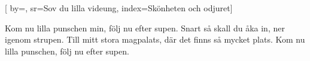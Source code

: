 

[ 		%
	by={},					%
	sr={Sov du lilla videung},					%
	index={Skönheten och odjuret}]						%
	

\beginverse*						%
Kom nu lilla punschen min,
följ nu efter supen. 
Snart så skall du åka in,
ner igenom strupen.
Till mitt stora magpalats,
där det finns så mycket plats.
Kom nu lilla punschen,
följ nu efter supen.
\endverse							%

\endsong							%